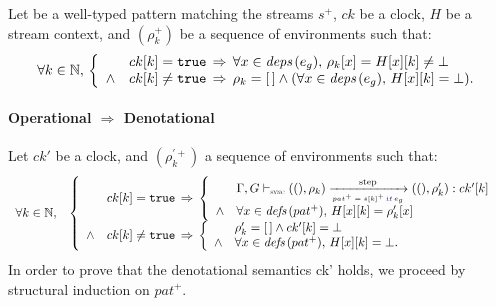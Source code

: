\begin{skippableproof}
    Let  be a well-typed \GRSync pattern matching the streams $s^+$, $ck$
    be a clock, $H$ be a stream context, and $(\rho_k^+)$ be a sequence of environments such that:
    \begin{equation*}
        \forall k \in \mathbb{N}, \,
        \left\{
        \begin{array}{ll}
                   & ck[k] = \mathtt{{true}} \, \Rightarrow \, \forall x \in {\ensuremath{\textit{deps}\left(e_g\right)}}, \,
            \rho_k[x] = H[x][k] \neq \bot                                                  \\
            \wedge & ck[k] \neq \mathtt{{true}} \, \Rightarrow \, \rho_k = [\,] \wedge (\forall
            x \in {\ensuremath{\textit{deps}\left(e_g\right)}}, \, H[x][k] = \bot).                                          \\
        \end{array}
        \right.
    \end{equation*}

    \paragraph{Operational $\Rightarrow$ Denotational}
    \label{sec:semantics:grsync:theorems:equivalence:pat:proof:op_to_den}
    Let $ck'$ be a clock, and $(\rho_k^{\prime+})$ a sequence of environments such that:
    \begin{equation*}
        \begin{array}{ll}
            \forall k \in \N, &
            \left\{
            \begin{array}{ll}
                       & ck[k] = \true \, \Rightarrow \,
                \left\{
                \begin{array}{ll}
                           & \patOpsem{\rho_k}{\guarded{pat^+ = s[k]^+}{e_g}}{ck'[k]}{\rho'_k} \\
                    \wedge & \forall x \in \defs{pat^+}, \, H[x][k] = \rho'_k[x]               \\
                \end{array}
                \right.                                     \\
                \wedge & ck[k] \neq \true \, \Rightarrow \,
                \left\{
                \begin{array}{ll}
                           & \rho'_k = \emptyrho \wedge ck'[k] = \bot       \\
                    \wedge & \forall x \in \defs{pat^+}, \, H[x][k] = \bot. \\
                \end{array}
                \right.                                     \\
            \end{array}
            \right.
        \end{array}
    \end{equation*}
    In order to prove that the denotational semantics 
    {ck'} holds, we proceed by structural induction on $pat^+$.


\end{skippableproof}
